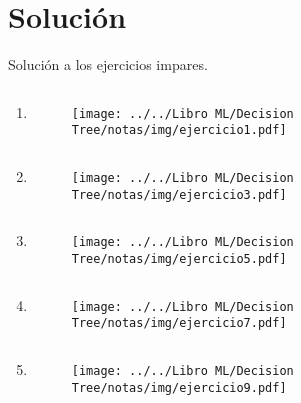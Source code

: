 \documentclass[
10pt, %
a4paper, %
]{article}
\begin{document}

\section{Solución}
Solución a los ejercicios impares.
\begin{enumerate}
	\item \begin{verbatim} \end{verbatim}
		\begin{figure}[H]
			\centering
			\texttt{[image: ../../Libro ML/Decision Tree/notas/img/ejercicio1.pdf]}
		\end{figure}
	
	\setcounter{enumi}{2}
	\item \begin{verbatim} \end{verbatim}
		\begin{figure}[H]
			\centering
			\texttt{[image: ../../Libro ML/Decision Tree/notas/img/ejercicio3.pdf]}
		\end{figure}
	
	\setcounter{enumi}{4}
	\item \begin{verbatim} \end{verbatim}
		\begin{figure}[H]
			\centering
			\texttt{[image: ../../Libro ML/Decision Tree/notas/img/ejercicio5.pdf]}
		\end{figure}

	\setcounter{enumi}{6}
	\item \begin{verbatim} \end{verbatim}
		\begin{figure}[H]
			\centering
			\texttt{[image: ../../Libro ML/Decision Tree/notas/img/ejercicio7.pdf]}
		\end{figure}

	\setcounter{enumi}{8}
	\item \begin{verbatim} \end{verbatim}
		\begin{figure}[H]
			\centering
			\texttt{[image: ../../Libro ML/Decision Tree/notas/img/ejercicio9.pdf]}
		\end{figure}
\end{enumerate}



\end{document}
